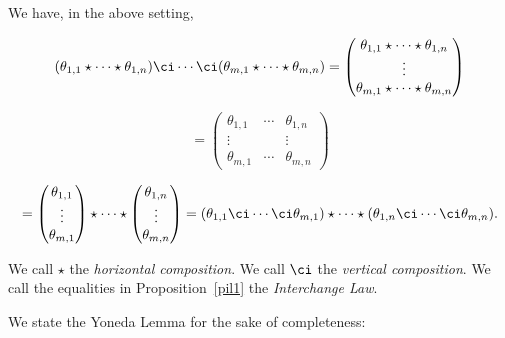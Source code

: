 \documentclass[12pt]{article}
\theoremstyle{remark}
\theoremstyle{definition}
\begin{document}
\begin{prop}
We have, in the above setting,

$$
(\theta_{1,1}\star\cdots\star\theta_{1,n})\ci\cdots\ci(\theta_{m,1}\star\cdots\star\theta_{m,n})
=\begin{pmatrix}
\theta_{1,1}\star\cdots\star\theta_{1,n}\\
\vdots\\ 
\theta_{m,1}\star\cdots\star\theta_{m,n}
\end{pmatrix}
$$ 

$$
=\begin{pmatrix}
\theta_{1,1}&\cdots&\theta_{1,n}\\
\vdots&&\vdots\\ 
\theta_{m,1}&\cdots&\theta_{m,n}
\end{pmatrix}
$$

$$
=\begin{pmatrix}\theta_{1,1}\\ \vdots\\ \theta_{m,1}\end{pmatrix}\star\cdots\star
\begin{pmatrix}\theta_{1,n}\\ \vdots\\ \theta_{m,n}\end{pmatrix}
=(\theta_{1,1}\ci\cdots\ci\theta_{m,1})\star\cdots\star(\theta_{1,n}\ci\cdots\ci\theta_{m,n}).
$$
\end{prop}

\begin{df} 
We call $\star$\index{$\star$} the {\em horizontal composition}. We call $\ci$ the {\em vertical composition}. We call the equalities in Proposition~\ref{pil1} the {\em Interchange Law}.
\end{df}




We state the Yoneda Lemma for the sake of completeness:
\end{document}

